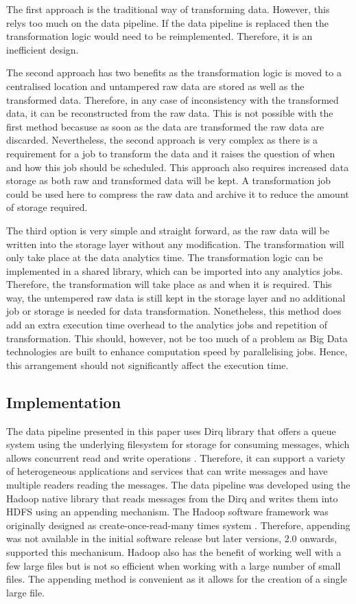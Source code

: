 The first approach is the traditional way of transforming data. However, this relys too much on the data pipeline. If the data pipeline is replaced then the transformation logic would need to be reimplemented. Therefore, it is an inefficient design.

The second approach has two benefits as the transformation logic is moved to a centralised location and untampered raw data are stored as well as the transformed data. Therefore, in any case of inconsistency with the transformed data, it can be reconstructed from the raw data. This is not possible with the first method becasuse as soon as the data are transformed the raw data are discarded. Nevertheless, the second approach is very complex as there is a requirement for a job to transform the data and it raises the question of when and how this job should be scheduled. This approach also requires increased data storage as both raw and transformed data will be kept. A transformation job could be used here to compress the raw data and archive it to reduce the amount of storage required.

The third option is very simple and straight forward, as the raw data will be written into the storage layer without any modification. The transformation will only take place at the data analytics time. The transformation logic can be implemented in a shared library, which can be imported into any analytics jobs. Therefore, the transformation will take place as and when it is required. This way, the untempered raw data is still kept in the storage layer and no additional job or storage is needed for data transformation. Nonetheless, this method does add an extra execution time overhead to the analytics jobs and repetition of transformation. This should, however, not be too much of a problem as Big Data technologies are built to enhance computation speed by parallelising jobs. Hence, this arrangement should not significantly affect the execution time.

\subsection{Implementation} \label{lbl-implementation}
	The data pipeline presented in this paper uses Dirq library that offers a queue system using the underlying filesystem for storage for consuming messages, which allows concurrent read and write operations \cite{Dirg17}. Therefore, it can support a variety of heterogeneous applications and services that can write messages and have multiple readers reading the messages. The data pipeline was developed using the Hadoop native library that reads messages from the Dirq and writes them into HDFS using an appending mechanism. The Hadoop software framework was originally designed as create-once-read-many times system \cite{Hadoop18}. Therefore, appending was not available in the initial software release but later versions, 2.0 onwards, supported this mechanisum. Hadoop also has the benefit of working well with a few large files but is not so efficient when working with a large number of small files. The appending method is convenient as it allows for the creation of a single large file.

